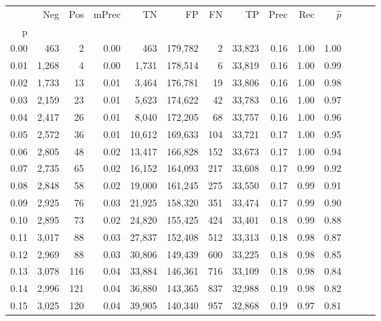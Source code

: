\begin{tabular}{rrrrrrrrrrrrrr}
\toprule
{} &    Neg &  Pos & mPrec &       TN &       FP &      FN &      TP &  Prec &   Rec & $\hat{p}$ \\
p    &        &      &       &          &          &         &         &       &       &           \\
\midrule
0.00 &    463 &    2 &  0.00 &      463 &  179,782 &       2 &  33,823 &  0.16 &  1.00 &      1.00 \\
0.01 &  1,268 &    4 &  0.00 &    1,731 &  178,514 &       6 &  33,819 &  0.16 &  1.00 &      0.99 \\
0.02 &  1,733 &   13 &  0.01 &    3,464 &  176,781 &      19 &  33,806 &  0.16 &  1.00 &      0.98 \\
0.03 &  2,159 &   23 &  0.01 &    5,623 &  174,622 &      42 &  33,783 &  0.16 &  1.00 &      0.97 \\
0.04 &  2,417 &   26 &  0.01 &    8,040 &  172,205 &      68 &  33,757 &  0.16 &  1.00 &      0.96 \\
0.05 &  2,572 &   36 &  0.01 &   10,612 &  169,633 &     104 &  33,721 &  0.17 &  1.00 &      0.95 \\
0.06 &  2,805 &   48 &  0.02 &   13,417 &  166,828 &     152 &  33,673 &  0.17 &  1.00 &      0.94 \\
0.07 &  2,735 &   65 &  0.02 &   16,152 &  164,093 &     217 &  33,608 &  0.17 &  0.99 &      0.92 \\
0.08 &  2,848 &   58 &  0.02 &   19,000 &  161,245 &     275 &  33,550 &  0.17 &  0.99 &      0.91 \\
0.09 &  2,925 &   76 &  0.03 &   21,925 &  158,320 &     351 &  33,474 &  0.17 &  0.99 &      0.90 \\
0.10 &  2,895 &   73 &  0.02 &   24,820 &  155,425 &     424 &  33,401 &  0.18 &  0.99 &      0.88 \\
0.11 &  3,017 &   88 &  0.03 &   27,837 &  152,408 &     512 &  33,313 &  0.18 &  0.98 &      0.87 \\
0.12 &  2,969 &   88 &  0.03 &   30,806 &  149,439 &     600 &  33,225 &  0.18 &  0.98 &      0.85 \\
0.13 &  3,078 &  116 &  0.04 &   33,884 &  146,361 &     716 &  33,109 &  0.18 &  0.98 &      0.84 \\
0.14 &  2,996 &  121 &  0.04 &   36,880 &  143,365 &     837 &  32,988 &  0.19 &  0.98 &      0.82 \\
0.15 &  3,025 &  120 &  0.04 &   39,905 &  140,340 &     957 &  32,868 &  0.19 &  0.97 &      0.81 \\

\end{tabular}
